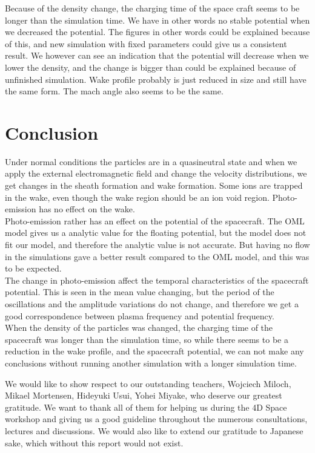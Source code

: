 \documentclass[aip, 
rsi, 
amsmath,
amssymb,
longbibliography,
preprint]{revtex4-1}
\begin{document}
Because of the density change, the charging time of the space craft seems to be longer than the simulation time. We have in other words no stable potential when we decreased the potential. The figures in other words could be explained because of this, and new simulation with fixed parameters could give us a consistent result. We however can see an indication that the potential will decrease when we lower the density, and the change is bigger than could be explained because of unfinished simulation. Wake profile probably is just reduced in size and still have the same form. The mach angle also seems to be the same. 

\section{Conclusion}
Under normal conditions the particles are in a quasineutral state and when we apply the external electromagnetic field and change the velocity distributions, we get changes in the sheath formation and wake formation. Some ions are trapped in the wake, even though the wake region should be an ion void region. Photo-emission has no effect on the wake. \\

Photo-emission rather has an effect on the potential of the spacecraft. The OML model gives us a analytic value for the floating potential, but the model does not fit our model, and therefore the analytic value is not accurate. But having no flow in the simulations gave a better result compared to the OML model, and this was to be expected. \\

The change in photo-emission affect the temporal characteristics of the spacecraft potential. This is seen in the mean value changing, but the period of the oscillations and the amplitude variations do not change, and therefore we get a good correspondence between plasma frequency and potential frequency. \\

When the density of the particles was changed, the charging time of the spacecraft was longer than the simulation time, so while there seems to be a reduction in the wake profile, and the spacecraft potential, we can not make any conclusions without running another simulation with a longer simulation time.

\begin{acknowledgments}
We would like to show respect to our outstanding teachers, Wojciech Miloch, Mikael Mortensen, Hideyuki Usui, Yohei Miyake, who deserve our greatest gratitude. We want to thank all of them for helping us during the 4D Space workshop and giving us a good guideline throughout the numerous consultations, lectures and discussions. We would also like to extend our gratitude to Japanese sake, which without this report would not exist.
\end{acknowledgments}


\end{document}
